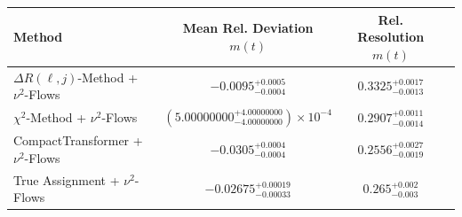     \begin{tabular}{lccc}
        \toprule
        Method & Mean Rel. Deviation $m(t)$ & Rel. Resolution $m(t)$ \\
        \midrule
        $\Delta R(\ell,j)$-Method + $\nu^2$-Flows & $-0.0095^{+0.0005}_{-0.0004}$ & $0.3325^{+0.0017}_{-0.0013}$ \\
        $\chi^2$-Method + $\nu^2$-Flows & $(5.00000000^{+4.00000000}_{-4.00000000})\times 10^{-4}$ & $0.2907^{+0.0011}_{-0.0014}$ \\
        CompactTransformer + $\nu^2$-Flows & $-0.0305^{+0.0004}_{-0.0004}$ & $0.2556^{+0.0027}_{-0.0019}$ \\
        True Assignment + $\nu^2$-Flows & $-0.02675^{+0.00019}_{-0.00033}$ & $0.265^{+0.002}_{-0.003}$ \\
        \bottomrule
    \end{tabular}